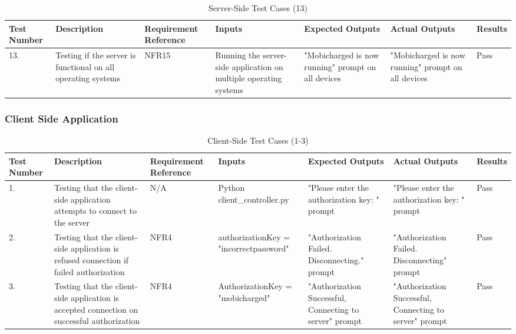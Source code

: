 \documentclass[12pt, titlepage]{article}
\begin{document}
\begin{center}
    \begin{table}[H]
        \centering
        \begin{tabular}{|p{1cm}|p{2.2cm}|p{2.5cm}|p{2.7cm}|p{2.4cm}|p{2.4cm}|p{1.3cm}|}
        \hline
        \bf Test Number & \bf Description & \bf Requirement Reference & \bf Inputs & \bf Expected Outputs & \bf Actual Outputs & \bf Results \\
        \hline
        13. & Testing if the server is functional on all operating systems & NFR15 & Running the server-side application on multiple operating systems & "Mobicharged is now running" prompt on all devices & "Mobicharged is now running" prompt on all devices & Pass\\
        \hline
        \end{tabular}
        \caption{Server-Side Test Cases (13)}
        \label{tab:my_label6}
    \end{table}
\end{center}

\subsubsection{Client Side Application}

\begin{center}
    \begin{table}[H]
        \centering
        \begin{tabular}{|p{1cm}|p{2.2cm}|p{2.5cm}|p{2.7cm}|p{2.4cm}|p{2.4cm}|p{1.3cm}|}
        \hline
        \bf Test Number & \bf Description & \bf Requirement Reference & \bf Inputs & \bf Expected Outputs & \bf Actual Outputs & \bf Results \\
        \hline
        1. & Testing that the client-side application attempts to connect to the server & N/A & Python client\newline\_controller.py & "Please enter the authorization key: " prompt & "Please enter the authorization key: " prompt & Pass\\
        \hline
        2. & Testing that the client-side application is refused connection if failed authorization & NFR4 & authorizationKey  = "incorrectpassword" & "Authorization Failed. Disconnecting." prompt & "Authorization Failed. Disconnecting" prompt & Pass\\
        \hline
        3. & Testing that the client-side application is accepted connection on successful authorization & NFR4 & AuthorizationKey = "mobicharged" & "Authorization Successful, Connecting to server" prompt & "Authorization Successful, Connecting to server" prompt & Pass\\
        \hline
        \end{tabular}
        \caption{Client-Side Test Cases (1-3)}
        \label{tab:my_label7}
    \end{table}
\end{center}
\fancyhf{}
\fancyhead[C]{\thepage}
\renewcommand{\headrulewidth}{0pt}
\pagestyle{plain}
\end{document}
